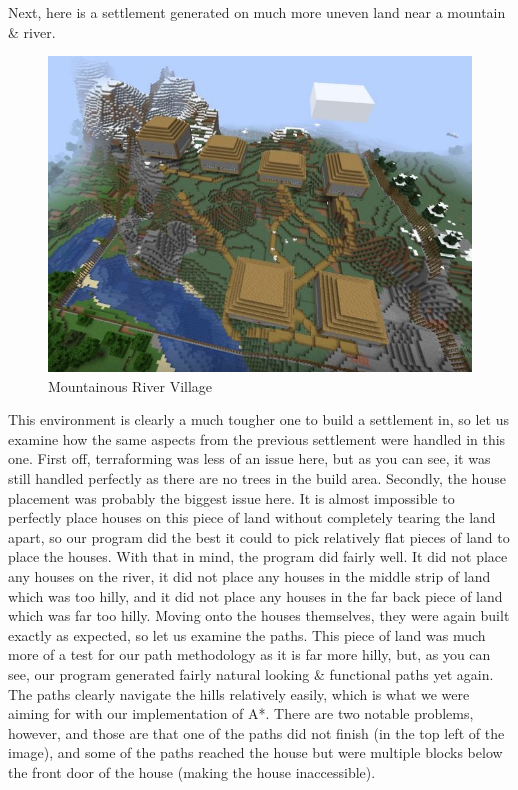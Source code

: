 \documentclass[11pt, oneside]{article}
\begin{document}
\begin{normalsize}
Next, here is a settlement generated on much more uneven land near a mountain \& river. 
\begin{figure}[H]
    \centering
    \includegraphics[width=0.75\linewidth]{village2}
    \caption{Mountainous River Village}
    \label{fig:river}
\end{figure}

This environment is clearly a much tougher one to build a settlement in, so let us examine how the same aspects from the previous settlement were handled in this one. 
First off, terraforming was less of an issue here, but as you can see, it was still handled perfectly as there are no trees in the build area. 
Secondly, the house placement was probably the biggest issue here. 
It is almost impossible to perfectly place houses on this piece of land without completely tearing the land apart, so our program did the best it could to pick relatively flat pieces of land to place the houses. 
With that in mind, the program did fairly well. 
It did not place any houses on the river, it did not place any houses in the middle strip of land which was too hilly, and it did not place any houses in the far back piece of land which was far too hilly. 
Moving onto the houses themselves, they were again built exactly as expected, so let us examine the paths. 
This piece of land was much more of a test for our path methodology as it is far more hilly, but, as you can see, our program generated fairly natural looking \& functional paths yet again. 
The paths clearly navigate the hills relatively easily, which is what we were aiming for with our implementation of A*. 
There are two notable problems, however, and those are that one of the paths did not finish (in the top left of the image), and some of the paths reached the house but were multiple blocks below the front door of the house (making the house inaccessible). 


\end{normalsize}
\end{document}
